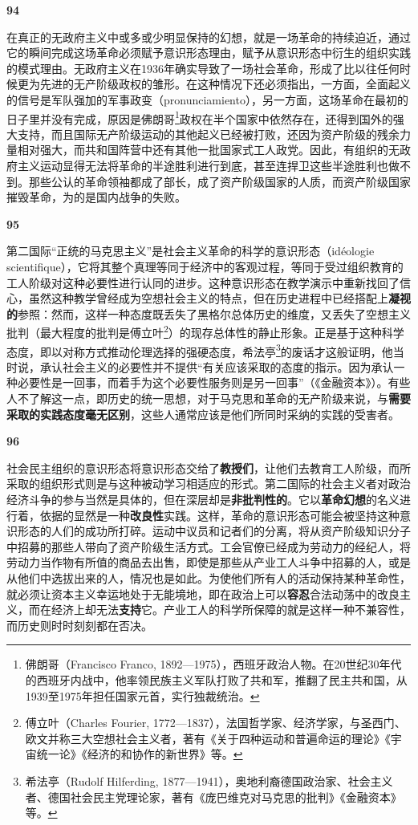 \documentclass[fontset=fandol, a4paper, 12pt, openright]{ctexbook}
\makeatletter
\newcommand{\thesis}[1]{%
    \par\vspace{1.5em}%
    {\centering \textbf{\Large #1}\par}%
    \nobreak\vspace{0.5em}\nobreak
    \@afterindenttrue %
    \@afterheading    %
}
\makeatother
\begin{document}
\thesis{94}
在真正的无政府主义中或多或少明显保持的幻想，就是一场革命的持续迫近，通过它的瞬间完成这场革命必须赋予意识形态理由，赋予从意识形态中衍生的组织实践的模式理由。无政府主义在1936年确实导致了一场社会革命，形成了比以往任何时候更为先进的无产阶级政权的雏形。在这种情况下还必须指出，一方面，全面起义的信号是军队强加的军事政变（pronunciamiento），另一方面，这场革命在最初的日子里并没有完成，原因是佛朗哥\footnote{佛朗哥（Francisco Franco, 1892—1975），西班牙政治人物。在20世纪30年代的西班牙内战中，他率领民族主义军队打败了共和军，推翻了民主共和国，从1939至1975年担任国家元首，实行独裁统治。}政权在半个国家中依然存在，还得到国外的强大支持，而且国际无产阶级运动的其他起义已经被打败，还因为资产阶级的残余力量相对强大，而共和国阵营中还有其他一批国家式工人政党。因此，有组织的无政府主义运动显得无法将革命的半途胜利进行到底，甚至连捍卫这些半途胜利也做不到。那些公认的革命领袖都成了部长，成了资产阶级国家的人质，而资产阶级国家摧毁革命，为的是国内战争的失败。

\thesis{95}
第二国际“正统的马克思主义”是社会主义革命的科学的意识形态（idéologie scientifique），它将其整个真理等同于经济中的客观过程，等同于受过组织教育的工人阶级对这种必要性进行认同的进步。这种意识形态在教学演示中重新找回了信心，虽然这种教学曾经成为空想社会主义的特点，但在历史进程中已经搭配上\textbf{凝视的}参照：然而，这样一种态度既丢失了黑格尔总体历史的维度，又丢失了空想主义批判（最大程度的批判是傅立叶\footnote{傅立叶（Charles Fourier, 1772—1837），法国哲学家、经济学家，与圣西门、欧文并称三大空想社会主义者，著有《关于四种运动和普遍命运的理论》《宇宙统一论》《经济的和协作的新世界》等。}）的现存总体性的静止形象。正是基于这种科学态度，即以对称方式推动伦理选择的强硬态度，希法亭\footnote{希法亭（Rudolf Hilferding, 1877—1941），奥地利裔德国政治家、社会主义者、德国社会民主党理论家，著有《庞巴维克对马克思的批判》《金融资本》等。}的废话才这般证明，他当时说，承认社会主义的必要性并不提供“有关应该采取的态度的指示。因为承认一种必要性是一回事，而着手为这个必要性服务则是另一回事”（《金融资本》）。有些人不了解这一点，即历史的统一思想，对于马克思和革命的无产阶级来说，与\textbf{需要采取的实践态度毫无区别}，这些人通常应该是他们所同时采纳的实践的受害者。

\thesis{96}
社会民主组织的意识形态将意识形态交给了\textbf{教授们}，让他们去教育工人阶级，而所采取的组织形式则是与这种被动学习相适应的形式。第二国际的社会主义者对政治经济斗争的参与当然是具体的，但在深层却是\textbf{非批判性的}。它以\textbf{革命幻想}的名义进行着，依据的显然是一种\textbf{改良性}实践。这样，革命的意识形态可能会被坚持这种意识形态的人们的成功所打碎。运动中议员和记者们的分离，将从资产阶级知识分子中招募的那些人带向了资产阶级生活方式。工会官僚已经成为劳动力的经纪人，将劳动力当作物有所值的商品去出售，即使是那些从产业工人斗争中招募的人，或是从他们中选拔出来的人，情况也是如此。为使他们所有人的活动保持某种革命性，就必须让资本主义幸运地处于无能境地，即在政治上可以\textbf{容忍}合法动荡中的改良主义，而在经济上却无法\textbf{支持}它。产业工人的科学所保障的就是这样一种不兼容性，而历史则时时刻刻都在否决。
\end{document}
